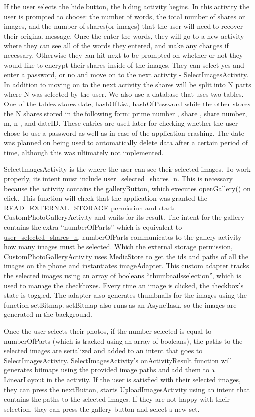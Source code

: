 	If the user selects the hide button, the hiding activity begins. In this activity the user is prompted to choose: the number of words, the total number of shares or images,
	and the number of shares(or images) that the user will need to recover their original message. Once the enter the words, they will go to a new activity where they can see
	all of the words they entered, and make any changes if necessary. Otherwise they can hit next to be prompted on whether or not they would like to encrypt their shares inside of
	the images. They can select yes and enter a password, or no and move on to the next activity - SelectImagesActivity. In addition to moving on to the next activity the shares will be split into
	N parts where N was selected by the user. We also use a database that uses two tables. One of the tables stores date, hashOfList, hashOfPassword while the other stores the N shares stored in the following form: prime number , share , share number, m, n
	, and dateID. These entries are used later for checking whether the user chose to use a password as well as in case of the application crashing. The date was planned on being used to automatically delete data after a certain period of time, although
	this was ultimately not implemented.

SelectImagesActivity is the where the user can see their selected images. To work properly, its intent must include \url{user_selected_shares_n}. This is necessary because the activity contains the galleryButton, which executes openGallery() on click.
This function will check that the application was granted the \url{READ_EXTERNAL_STORAGE} permission and starts CustomPhotoGalleryActivity and waits for its result.
The intent for the gallery contains the extra “numberOfParts” which is equivalent to \url{user_selected_shares_n}. numberOfParts communicates to the gallery activity how many images must be selected.
Which the external storage permission, CustomPhotoGalleryActivity uses MediaStore to get the ids and paths of all the images on the phone and instantiates imageAdapter.
This custom adapter tracks the selected images using an array of booleans “thumbnailsselection”, which is used to manage the checkboxes. Every time an image is clicked, the checkbox’s state is toggled.
The adapter also generates thumbnails for the images using the function setBitmap. setBitmap also runs as an AsyncTask, so the images are generated in the background.


  Once the user selects their photos, if the number selected is equal to numberOfParts (which is tracked using an array of booleans), the paths to the selected images are serialized and added to an intent that goes to SelectImagesActivity.
  SelectImagesActivity’s onActivityResult function will generates bitmaps using the provided image paths and add them to a LinearLayout in the activity. If the user is satisfied with their selected images, they can press the nextButton, starts UploadImagesActivity using an intent that contains the paths to the selected images.
  If they are not happy with their selection, they can press the gallery button and select a new set.


